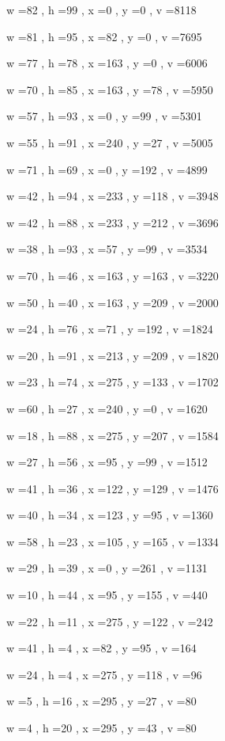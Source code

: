 \documentclass[11pt]{article}
\begin{document}
w =82 , h =99 , x =0 , y =0 , v =8118
\par
w =81 , h =95 , x =82 , y =0 , v =7695
\par
w =77 , h =78 , x =163 , y =0 , v =6006
\par
w =70 , h =85 , x =163 , y =78 , v =5950
\par
w =57 , h =93 , x =0 , y =99 , v =5301
\par
w =55 , h =91 , x =240 , y =27 , v =5005
\par
w =71 , h =69 , x =0 , y =192 , v =4899
\par
w =42 , h =94 , x =233 , y =118 , v =3948
\par
w =42 , h =88 , x =233 , y =212 , v =3696
\par
w =38 , h =93 , x =57 , y =99 , v =3534
\par
w =70 , h =46 , x =163 , y =163 , v =3220
\par
w =50 , h =40 , x =163 , y =209 , v =2000
\par
w =24 , h =76 , x =71 , y =192 , v =1824
\par
w =20 , h =91 , x =213 , y =209 , v =1820
\par
w =23 , h =74 , x =275 , y =133 , v =1702
\par
w =60 , h =27 , x =240 , y =0 , v =1620
\par
w =18 , h =88 , x =275 , y =207 , v =1584
\par
w =27 , h =56 , x =95 , y =99 , v =1512
\par
w =41 , h =36 , x =122 , y =129 , v =1476
\par
w =40 , h =34 , x =123 , y =95 , v =1360
\par
w =58 , h =23 , x =105 , y =165 , v =1334
\par
w =29 , h =39 , x =0 , y =261 , v =1131
\par
w =10 , h =44 , x =95 , y =155 , v =440
\par
w =22 , h =11 , x =275 , y =122 , v =242
\par
w =41 , h =4 , x =82 , y =95 , v =164
\par
w =24 , h =4 , x =275 , y =118 , v =96
\par
w =5 , h =16 , x =295 , y =27 , v =80
\par
w =4 , h =20 , x =295 , y =43 , v =80
\par
\newpage
\end{document}
